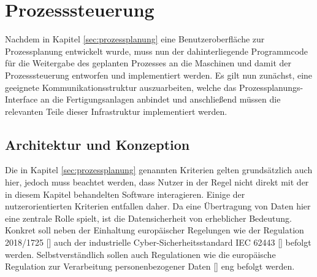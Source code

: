 \section{Prozesssteuerung}
\label{sec:prozesssteuerung}

Nachdem in Kapitel \ref{sec:prozessplanung} eine Benutzeroberfläche zur Prozessplanung entwickelt wurde, muss nun der dahinterliegende Programmcode für die Weitergabe des geplanten Prozesses an die Maschinen und damit der Prozesssteuerung entworfen und implementiert werden. Es gilt nun zunächst, eine geeignete Kommunikationsstruktur auszuarbeiten, welche das Prozessplanungs-Interface an die Fertigungsanlagen anbindet und anschließend müssen die relevanten Teile dieser Infrastruktur implementiert werden.

\subsection*{Architektur und Konzeption}
\label{subsec:prozesssteuerung_architektur}

Die in Kapitel \ref{sec:prozessplanung} genannten Kriterien gelten grundsätzlich auch hier, jedoch muss beachtet werden, dass Nutzer in der Regel nicht direkt mit der in diesem Kapitel behandelten Software interagieren. Einige der nutzerorientierten Kriterien entfallen daher. Da eine Übertragung von Daten hier eine zentrale Rolle spielt, ist die Datensicherheit von erheblicher Bedeutung. Konkret soll neben der Einhaltung europäischer Regelungen wie der Regulation 2018/1725 [\cite{euDataProtectionRegulation}] auch der industrielle Cyber-Sicherheitsstandard IEC 62443 [\cite{IEC62443}] befolgt werden. Selbstverständlich sollen auch Regulationen wie die europäische Regulation zur Verarbeitung personenbezogener Daten [\cite{euDataProtectionRegulation}] eng befolgt werden.

